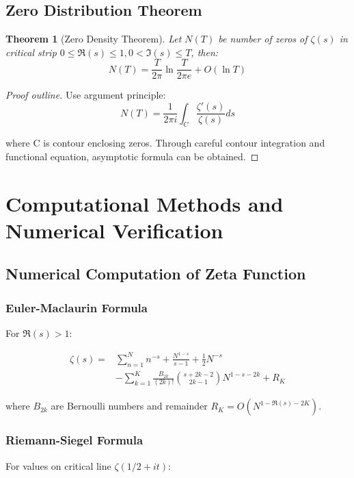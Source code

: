 \documentclass[12pt,a4paper]{article}
\newtheorem{theorem}{Theorem}[section]
\begin{document}
\subsection{Zero Distribution Theorem}

\begin{theorem}[Zero Density Theorem]
Let $N(T)$ be number of zeros of $\zeta(s)$ in critical strip $0 \leq \Re(s) \leq 1, 0 < \Im(s) \leq T$, then:
$$N(T) = \frac{T}{2\pi} \ln \frac{T}{2\pi e} + O(\ln T)$$
\end{theorem}

\begin{proof}[Proof outline]
Use argument principle:
$$N(T) = \frac{1}{2\pi i} \int_C \frac{\zeta'(s)}{\zeta(s)} ds$$

where C is contour enclosing zeros. Through careful contour integration and functional equation, asymptotic formula can be obtained.
\end{proof}

\section{Computational Methods and Numerical Verification}

\subsection{Numerical Computation of Zeta Function}

\subsubsection{Euler-Maclaurin Formula}

For $\Re(s) > 1$:

\begin{align}
\zeta(s) = &\sum_{n=1}^{N} n^{-s} + \frac{N^{1-s}}{s-1} + \frac{1}{2}N^{-s} \\
&- \sum_{k=1}^{K} \frac{B_{2k}}{(2k)!} \binom{s+2k-2}{2k-1} N^{1-s-2k} + R_K
\end{align}

where $B_{2k}$ are Bernoulli numbers and remainder $R_K = O(N^{1-\Re(s)-2K})$.

\subsubsection{Riemann-Siegel Formula}

For values on critical line $\zeta(1/2 + it)$:
\end{document}
